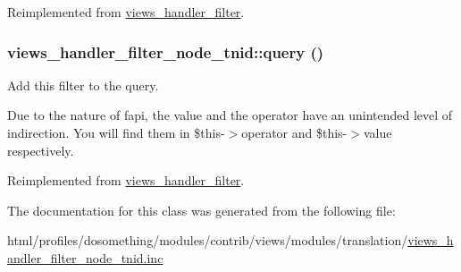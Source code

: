 Reimplemented from \hyperlink{classviews__handler__filter_a8c77c0a8bba8c3ceceae8950fc7b1121}{views\_\-handler\_\-filter}.\hypertarget{classviews__handler__filter__node__tnid_a7e51dd45867a8a4a3c965a09d0ecd3b6}{
\subsubsection[{query}]{\setlength{\rightskip}{0pt plus 5cm}views\_\-handler\_\-filter\_\-node\_\-tnid::query ()}}
\label{classviews__handler__filter__node__tnid_a7e51dd45867a8a4a3c965a09d0ecd3b6}
Add this filter to the query.

Due to the nature of fapi, the value and the operator have an unintended level of indirection. You will find them in \$this-\/$>$operator and \$this-\/$>$value respectively. 

Reimplemented from \hyperlink{classviews__handler__filter_a8e513b3abbc2559f37b550ca4957b4ae}{views\_\-handler\_\-filter}.

The documentation for this class was generated from the following file:\begin{DoxyCompactItemize}
\item 
html/profiles/dosomething/modules/contrib/views/modules/translation/\hyperlink{views__handler__filter__node__tnid_8inc}{views\_\-handler\_\-filter\_\-node\_\-tnid.inc}\end{DoxyCompactItemize}
